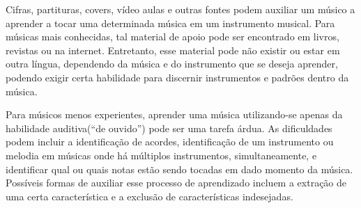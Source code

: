 \documentclass[
	12pt,				%
	openright,			%
	oneside,			%
	a4paper,			%
	english,			%
	brazil,				%
	]{abntex2}
\begin{document}






Cifras, partituras, covers, vídeo aulas e outras fontes podem auxiliar um músico a aprender a tocar uma determinada música em um instrumento musical. Para músicas mais conhecidas, tal material de apoio pode ser encontrado em livros, revistas ou na internet. Entretanto, esse material pode não existir ou estar em outra língua, dependendo da música e do instrumento que se deseja aprender, podendo exigir certa habilidade para discernir instrumentos e padrões dentro da música.

Para músicos menos experientes, aprender uma música utilizando-se apenas da habilidade auditiva(“de ouvido”) pode ser uma tarefa árdua. As dificuldades podem incluir a identificação de acordes, identificação de um instrumento ou melodia em músicas onde há múltiplos instrumentos, simultaneamente, e identificar qual ou quais notas estão sendo tocadas em dado momento da música. Possíveis formas de auxiliar esse processo de aprendizado incluem a extração de uma certa característica e a exclusão de características indesejadas.
\end{document}
